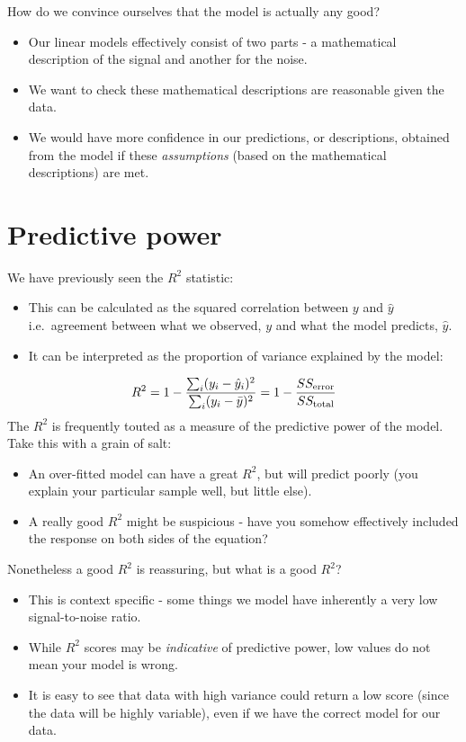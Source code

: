 \documentclass[
  oneside]{krantz}
\providecommand{\tightlist}{%
  \setlength{\itemsep}{0pt}\setlength{\parskip}{0pt}}
\begin{document}
How do we convince ourselves that the model is actually any good?

\begin{itemize}
\tightlist
\item
  Our linear models effectively consist of two parts - a mathematical description of the signal and another for the noise.
\item
  We want to check these mathematical descriptions are reasonable given the data.
\item
  We would have more confidence in our predictions, or descriptions, obtained from the model if these \emph{assumptions} (based on the mathematical descriptions) are met.
\end{itemize}

\hypertarget{predictive-power}{%
\section{Predictive power}\label{predictive-power}}

We have previously seen the \(R^2\) statistic:

\begin{itemize}
\item
  This can be calculated as the squared correlation between \(y\) and \(\hat{y}\) i.e.~agreement between what we observed, \(y\) and what the model predicts, \(\hat y\).
\item
  It can be interpreted as the proportion of variance explained by the model:
\end{itemize}

\[R^2 = 1-\frac{\sum_i (y_i-\hat{y}_i)^2}{\sum_i (y_i-\bar{y})^2} =1 - \frac{SS_{\rm error}}{SS_{\rm total}}\]
The \(R^2\) is frequently touted as a measure of the predictive power of the model. Take this with a grain of salt:

\begin{itemize}
\tightlist
\item
  An over-fitted model can have a great \(R^2\), but will predict poorly (you explain your particular sample well, but little else).
\item
  A really good \(R^2\) might be suspicious - have you somehow effectively included the response on both sides of the equation?
\end{itemize}

Nonetheless a good \(R^2\) is reassuring, but what is a good \(R^2\)?

\begin{itemize}
\item
  This is context specific - some things we model have inherently a very low signal-to-noise ratio.
\item
  While \(R^2\) scores may be \emph{indicative} of predictive power, low values do not mean your model is wrong.
\item
  It is easy to see that data with high variance could return a low score (since the data will be highly variable), even if we have the correct model for our data.
\end{itemize}
\end{document}
